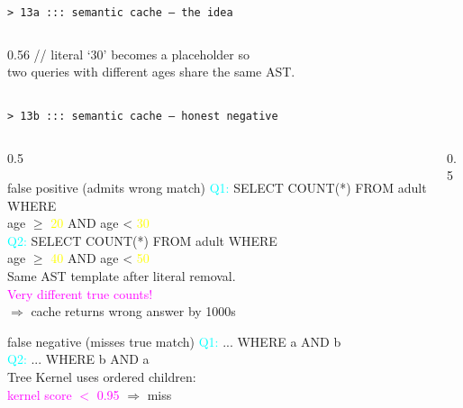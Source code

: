 \documentclass[aspectratio=169,10pt]{beamer}
\newcommand{\hi}[1]{\textcolor{neon}{#1}}
\newcommand{\hilo}[1]{\textcolor{magenta}{#1}}
\begin{document}
\begin{frame}{\texttt{> 13a ::: semantic cache -- the idea}}
\begin{columns}[T,onlytextwidth]
\begin{column}{0.56\textwidth}
\vspace{0.3em}
{\color{dim}\ttfamily\scriptsize // literal `30' becomes a placeholder so \\
two queries with different ages share the same AST.}

\end{column}
\end{columns}

\end{frame}

\begin{frame}{\texttt{> 13b ::: semantic cache -- honest negative}}

\begin{columns}[T,onlytextwidth]
\begin{column}{0.5\textwidth}

\begin{block}{\ttfamily\small false positive (admits wrong match)}
\ttfamily\scriptsize
\textcolor{cyan}{Q1:} \textcolor{neon}{SELECT COUNT(*)} \textcolor{fg}{FROM adult WHERE} \\
\hphantom{Q1: }\textcolor{fg}{age $\geq$} \textcolor{yellow}{20} \textcolor{fg}{AND age <} \textcolor{yellow}{30} \\[0.2em]
\textcolor{cyan}{Q2:} \textcolor{neon}{SELECT COUNT(*)} \textcolor{fg}{FROM adult WHERE} \\
\hphantom{Q2: }\textcolor{fg}{age $\geq$} \textcolor{yellow}{40} \textcolor{fg}{AND age <} \textcolor{yellow}{50} \\[0.3em]
\hi{Same AST template} after literal removal. \\
\hilo{Very different true counts!}\\
$\Rightarrow$ cache returns wrong answer by 1000s
\end{block}

\vspace{0.4em}
\begin{block}{\ttfamily\small false negative (misses true match)}
\ttfamily\scriptsize
\textcolor{cyan}{Q1:} \textcolor{fg}{... WHERE} \textcolor{neon}{a AND b} \\
\textcolor{cyan}{Q2:} \textcolor{fg}{... WHERE} \textcolor{neon}{b AND a} \\[0.3em]
Tree Kernel uses \hi{ordered children}: \\
\textcolor{magenta}{kernel score $<$ 0.95} $\Rightarrow$ miss
\end{block}

\end{column}
\begin{column}{0.5\textwidth}


\end{column}
\end{columns}
\end{frame}
\end{document}
